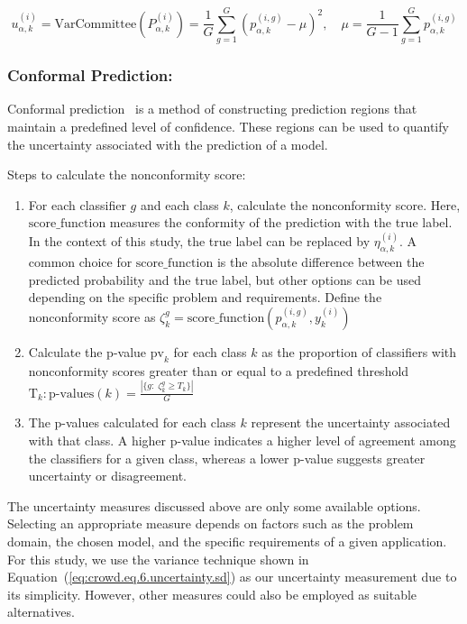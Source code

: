 \begin{equation}
    u_{\alpha,k}^{(i)} = \mathrm{VarCommittee}\left(P_{\alpha,k}^{(i)}\right) = \frac{1}{G}\sum_{g=1}^G {\left( p_{\alpha,k}^{(i,g)} - \mu \right)}^2 , \quad\mu= \frac{1}{G-1} \sum_{g=1}^G p_{\alpha,k}^{(i,g)}
    \label{eq:crowd.eq.8.uncertainty.committee_based}
\end{equation}

\subsubsection{Conformal Prediction:}

Conformal prediction~\cite{angelopoulos_Gentle_2021} is a method of constructing prediction regions that maintain a predefined level of confidence. These regions can be used to quantify the uncertainty associated with the prediction of a model.

Steps  to calculate the nonconformity score:
\begin{enumerate}
\item For each classifier $g $ and each class $k $, calculate the nonconformity score. Here, $\mathrm{score\_function}$ measures the conformity of the prediction with the true label. In the context of this study, the true label can be replaced by $\eta_{\alpha,k}^{(i)} $. A common choice for $\mathrm{score\_function}$ is the absolute difference between the predicted probability and the true label, but other options can be used depending on the specific problem and requirements. Define the nonconformity score as  $ \zeta_{k}^{g} = \mathrm{score\_function} \left(p_{\alpha,k}^{(i,g)}, y_k^{(i)}\right) $
\item Calculate the p-value $\mathrm{pv}_k $ for each class $k $ as the proportion of classifiers with nonconformity scores greater than or equal to a predefined threshold $\text{T}_k: \text{p-values}(k) = \frac{ \left\vert \{g: \;\zeta_{k}^{g} \geq T_k \} \right\vert} {G} $
\item The p-values calculated for each class $k $ represent the uncertainty associated with that class. A higher p-value indicates a higher level of agreement among the classifiers for a given class, whereas a lower p-value suggests greater uncertainty or disagreement.
\end{enumerate}

The uncertainty measures discussed above are only some available options. Selecting an appropriate measure depends on factors such as the problem domain, the chosen model, and the specific requirements of a given application. For this study, we use the variance technique shown in Equation~(\ref{eq:crowd.eq.6.uncertainty.sd}) as our uncertainty measurement due to its simplicity. However, other measures could also be employed as suitable alternatives.


